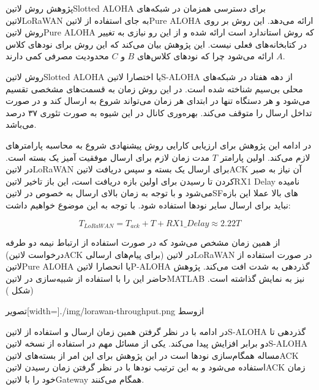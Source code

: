 
پژوهش  روش ‌لاتین{Slotted ALOHA} برای دسترسی همزمان در شبکه‌های ‌لاتین{LoRaWAN} به جای استفاده از ‌لاتین{Pure ALOHA} ارائه می‌دهد.
این روش بر روی روش ‌لاتین{Pure ALOHA} که روش استاندارد است ارائه شده و از این رو نیازی به تغییر در کتابخانه‌های فعلی نیست.
این پژوهش بیان می‌کند که این روش برای نودهای کلاس $A$ ارائه می‌شود چرا که نودهای کلاس‌های $B$ و $C$ محدودیت مصرفی کمی دارند.

روش ‌لاتین{Slotted ALOHA} یا اختصارا ‌لاتین{S-ALOHA} از دهه هفتاد در شبکه‌های محلی بی‌سیم شناخته شده است. در این روش زمان به قسمت‌های مشخصی تقسیم می‌شود
و هر دستگاه تنها در ابتدای هر زمان می‌تواند شروع به ارسال کند و در صورت تداخل ارسال را متوقف می‌کند. بهره‌وری کانال در این شیوه به صورت تئوری ۳۷ درصد می‌باشد.

در ادامه این پژوهش برای ارزیابی کارایی روش پیشنهادی شروع به محاسبه پارامترهای لازم می‌کند. اولین پارامتر $T$ مدت زمان لازم برای ارسال موفقیت آمیز یک بسته است. در ‌لاتین{LoRaWAN}
برای ارسال یک بسته و سپس دریافت ‌لاتین{ACK} آن نیاز به صبر کردن تا رسیدن برای اولین بازه دریافت است، این باز تاخیر ‌لاتین{RX1 Delay} نامیده می‌شود و با توجه به زمان بالای ارسال
به خصوص در ‌لاتین{SF}های بالا عملا این بازه نباید برای ارسال سایر نودها استفاده شود. با توجه به این موضوع خواهیم داشت:

\[
  T_{LoRaWAN} = T_{ack} + T + RX1\_Delay \approx 2.22T
\]

از همین زمان مشخص می‌شود که در صورت استفاده از ارتباط نیمه دو طرفه (درخواست ‌لاتین{ACK} برای پیام‌های ارسالی) در ‌لاتین{LoRaWAN} در صورت استفاده از ‌لاتین{Pure ALOHA}
یا انحصارا ‌لاتین{P-ALOHA} گذردهی به شدت افت می‌کند. پژوهش حاضر این را با استفاده از شبیه‌سازی در ‌لاتین{MATLAB} نیز به نمایش گذاشته است.(شکل )

‌تصویر[width=\textwidth]{./img/lorawan-throughput.png}
‌ازوسط

در ادامه با در نظر گرفتن همین زمان ارسال و استفاده از ‌لاتین{S-ALOHA} گذردهی تا دو برابر افزایش پیدا می‌کند. یکی از مسائل مهم در استفاده از نسخه ‌لاتین{S-ALOHA} مساله همگام‌سازی نودها است
در این پژوهش برای این امر از بسته‌های ‌لاتین{ACK} استفاده می‌شود و به این ترتیب نودها با در نظر گرفتن زمان رسیدن ‌لاتین{ACK} زمان خود را با ‌لاتین{Gateway} همگام می‌کنند.

